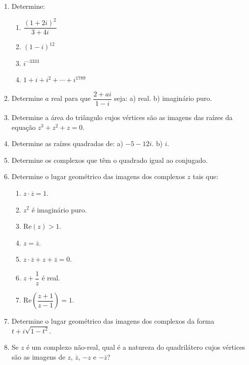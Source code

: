 \documentclass[12pt,a4paper]{article}
\begin{document}
\begin{enumerate}[label=\textbf{\arabic*)}, leftmargin=*]

    \item Determine:
    \begin{enumerate}[label=\alph*)]
        \item $\dfrac{(1 + 2i)^2}{3 + 4i}$
        \item $(1 - i)^{12}$
        \item $i^{-3333}$
        \item $1 + i + i^2 + \cdots + i^{1789}$
    \end{enumerate}

    \item Determine $a$ real para que $\dfrac{2 + ai}{1 - i}$ seja: a) real. b) imaginário puro.

    \item Determine a área do triângulo cujos vértices são as imagens das raízes da equação $z^3 + z^2 + z = 0$.

    \item Determine as raízes quadradas de: a) $-5 - 12i$. b) $i$.

    \item Determine os complexos que têm o quadrado igual ao conjugado.

    \item Determine o lugar geométrico das imagens dos complexos $z$ tais que:
    \begin{enumerate}[label=\alph*)]
        \item $z \cdot \overline{z} = 1$.
        \item $z^2$ é imaginário puro.
        \item $\text{Re}(z) > 1$.
        \item $z = \overline{z}$.
        \item $z \cdot \overline{z} + z + \overline{z} = 0$.
        \item $z + \dfrac{1}{z}$ é real.
        \item $\text{Re}\left(\dfrac{z + 1}{z - 1}\right) = 1$.
    \end{enumerate}

    \item Determine o lugar geométrico das imagens dos complexos da forma $t + i\sqrt{1 - t^2}$.

    \item Se $z$ é um complexo não-real, qual é a natureza do quadrilátero cujos vértices são as imagens de $z$, $\overline{z}$, $-z$ e $-\overline{z}$?


\end{enumerate}
\end{document}
